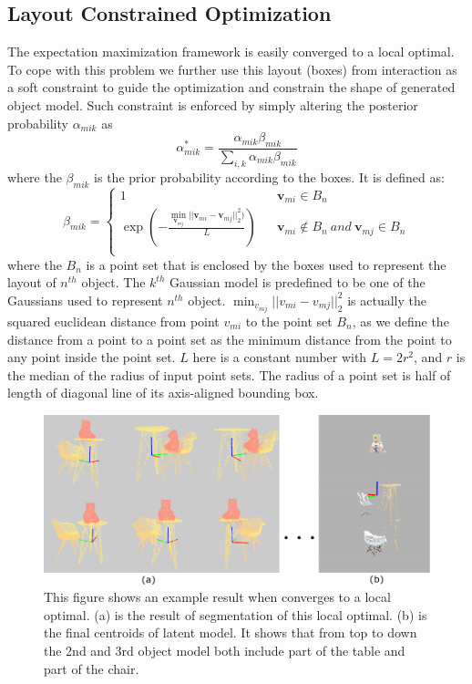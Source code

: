 \subsection{Layout Constrained Optimization}
The expectation maximization framework is easily converged to a local optimal. To cope with this problem we further use this layout (boxes) from interaction as a soft constraint to guide the optimization and constrain the shape of generated object model. Such constraint is enforced by simply altering the posterior probability $\alpha_{mik}$ as
%
\begin{equation}
	\label{equ:alteralpha}
	\alpha_{mik}^*=\frac{\alpha_{mik}\beta_{mik}}{\sum_{i,k}\alpha_{mik}\beta_{mik}}
\end{equation}
where the $\beta_{mik}$ is the prior probability according to the boxes. It is defined as:
\begin{equation}
	\beta_{mik}=\left\{
	\begin{array}{rcl}
		1& &\mathbf v_{mi} \in B_n\\
		\exp(-\frac{\min_{\mathbf v_{mj}}|| \mathbf v_{mi} - \mathbf v_{mj} ||_2^2  )}{L})& &\mathbf v_{mi} \notin B_n~and~\mathbf v_{mj} \in B_n\\
	\end{array} \right.
\end{equation}
where the $B_n$ is a point set that is enclosed by the boxes used to represent the layout of $n^{th}$ object. The $k^{th}$ Gaussian model is predefined to be one of the Gaussians used to represent $n^{th}$ object. $\min_{v_{mj}}|| v_{mi} - v_{mj} ||_2^2$ is actually the squared euclidean distance from point $v_{mi}$ to the point set $B_n$, as we define the distance from a point to a point set as the minimum distance from the point to any point inside the point set. $L$ here is a constant number with $L=2r^2$, and $r$ is the median of the radius of input point sets. The radius of a point set is half of length of diagonal line of its axis-aligned bounding box.   
\begin{figure}[htb]
	\centering
	\includegraphics[width=\linewidth]{images/localoptimal/localoptimal}
	\caption{\label{fig:localoptimal}This figure shows an example result when converges to a local optimal. (a) is the result of segmentation of this local optimal. (b) is the final centroids of latent model. It shows that from top to down the 2nd and 3rd object model both include part of the table and part of the chair.}
\end{figure}
